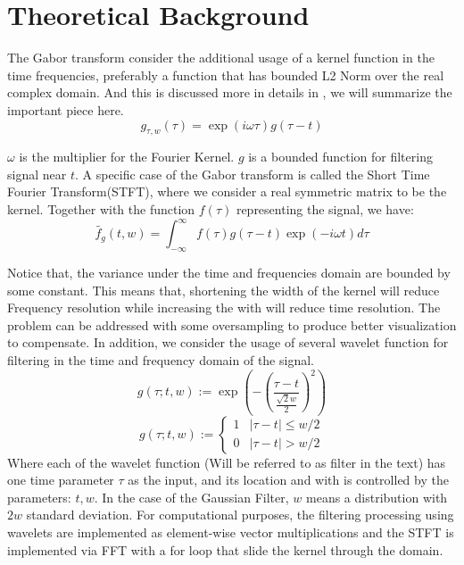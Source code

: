 \documentclass{article}
\begin{document}
\section{Theoretical Background}
    \par\hspace{1.1em}
    The Gabor transform consider the additional usage of a kernel function in the time frequencies, preferably a function that has bounded L2 Norm over the real complex domain. And this is discussed more in details in \cite{kutz_2013_pg324}, we will summarize the important piece here. 
    \begin{equation*}\tag{1}\label{eqn:1}
        g_{\tau, w}(\tau) = \exp(i\omega \tau)g(\tau - t)
    \end{equation*}
    \par
    $\omega$ is the multiplier for the Fourier Kernel. $g$ is a bounded function for filtering signal near $t$. A specific case of the Gabor transform is called the Short Time Fourier Transform(STFT), where we consider a real symmetric matrix to be the kernel. Together with the function $f(\tau)$ representing the signal, we have: 
    \begin{equation*}\tag{2}\label{eqn:2}
        \widetilde{f_g}(t, w) = \int_{-\infty}^{\infty} f(\tau)g(\tau - t)\exp(-i\omega t) d\tau
    \end{equation*}
    \par
    Notice that, the variance under the time and frequencies domain are bounded by some constant. This means that, shortening the width of the kernel will reduce Frequency resolution while increasing the with will reduce time resolution. %
    The problem can be addressed with some oversampling to produce better visualization to compensate. In addition, we consider the usage of several wavelet function for filtering in the time and frequency domain of the signal. 
    \begin{equation*}\tag{wavelet.G}\label{eqn:wavelet.G}
        g(\tau; t, w):=\exp \left(
            -
            \left(
                \frac{\tau - t}{\frac{\sqrt{2}w}{2}}
            \right)^2
        \right)
    \end{equation*}
    \begin{equation*}\tag{wavelet.S}\label{eqn:wavelet.S}
        g(\tau; t, w):=
        \begin{cases}
            1 & |\tau - t| \le w/2 \\ 0 & |\tau - t| > w/2
        \end{cases}
    \end{equation*}
    Where each of the wavelet function (Will be referred to as filter in the text) has one time parameter $\tau$ as the input, and its location and with is controlled by the parameters: $t, w$. In the case of the Gaussian Filter, $w$ means a distribution with $2w$ standard deviation. For computational purposes, the filtering processing using wavelets are implemented as element-wise vector multiplications and the STFT is implemented via FFT with a for loop that slide the kernel through the domain.
\end{document}
